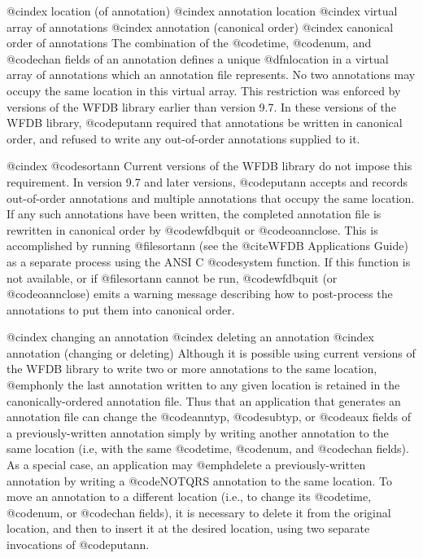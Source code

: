 {{{{{{{{{@cindex location (of annotation)
@cindex annotation location
@cindex virtual array of annotations
@cindex annotation (canonical order)
@cindex canonical order of annotations
The combination of the @code{time}, @code{num}, and @code{chan} fields of an
annotation defines a unique @dfn{location} in a virtual array of
annotations which an annotation file represents.  No two annotations may
occupy the same location in this virtual array.  This restriction was
enforced by versions of the WFDB library earlier than version 9.7.  In
these versions of the WFDB library, @code{putann} required that
annotations be written in canonical order, and refused to write any
out-of-order annotations supplied to it.

@cindex @code{sortann}
Current versions of the WFDB library do not impose this requirement.  In version
9.7 and later versions, @code{putann} accepts and records out-of-order
annotations and multiple annotations that occupy the same location.  If any
such annotations have been written, the completed annotation file is rewritten
in canonical order by @code{wfdbquit} or @code{oannclose}.  This is accomplished
by running @file{sortann} (see the @cite{WFDB Applications
Guide}) as a separate process using the ANSI C @code{system} function.  If this
function is not available, or if @file{sortann} cannot be run, @code{wfdbquit}
(or @code{oannclose}) emits a warning message describing how to post-process
the annotations to put them into canonical order.

@cindex changing an annotation
@cindex deleting an annotation
@cindex annotation (changing or deleting)
Although it is possible using current versions of the WFDB library to write two
or more annotations to the same location, @emph{only the last annotation
written to any given location is retained} in the canonically-ordered
annotation file.  Thus that an application that generates an annotation file
can change the @code{anntyp}, @code{subtyp}, or @code{aux} fields of a
previously-written annotation simply by writing another annotation to the same
location (i.e, with the same @code{time}, @code{num}, and @code{chan} fields).
As a special case, an application may @emph{delete} a previously-written
annotation by writing a @code{NOTQRS} annotation to the same location.  To move
an annotation to a different location (i.e., to change its @code{time},
@code{num}, or @code{chan} fields), it is necessary to delete it from the
original location, and then to insert it at the desired location, using two
separate invocations of @code{putann}.

}}}}}}}}}
